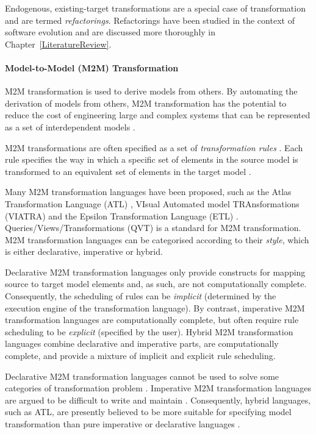 Endogenous, existing-target transformations are a special case of transformation and are termed \emph{refactorings}. Refactorings have been studied in the context of software evolution and are discussed more thoroughly in Chapter~\ref{LiteratureReview}.


\paragraph{Model-to-Model (M2M) Transformation} M2M transformation is used to derive models from others. By automating the derivation of models from others, M2M transformation has the potential to reduce the cost of engineering large and complex systems that can be represented as a set of interdependent models \cite{sendall03heart}. 

M2M transformations are often specified as a set of \emph{transformation rules} \cite{czarnecki06survey}. Each rule specifies the way in which a specific set of elements in the source model is transformed to an equivalent set of elements in the target model \cite[pg.44]{kolovos09thesis}.

Many M2M transformation languages have been proposed, such as the Atlas Transformation Language (ATL) \cite{jouault05transforming}, VIsual Automated model TRAnsformations (VIATRA) \cite{VIATRA} and the Epsilon Transformation Language (ETL) \cite{kolovos08etl}. Qu\-er\-ies/Vi\-ews/Tra\-nsfo\-rma\-ti\-ons (QVT) \cite{qvt} is a standard for M2M transformation. M2M transformation languages can be categorised according to their \emph{style}, which is either declarative, imperative or hybrid.

Declarative M2M transformation languages only provide constructs for mapping source to target model elements and, as such, are not computationally complete. Consequently, the scheduling of rules can be \emph{implicit} (determined by the execution engine of the transformation language). By contrast, imperative M2M transformation languages are computationally complete, but often require rule scheduling to be \emph{explicit} (specified by the user). Hybrid M2M transformation languages combine declarative and imperative parts, are computationally complete, and provide a mixture of implicit and explicit rule scheduling.

Declarative M2M transformation languages cannot be used to solve some categories of transformation problem \cite{patrascoiu04embedding}. Imperative M2M transformation languages are argued to be difficult to write and maintain \cite[pg.45]{kolovos09thesis}. Consequently, \cc hybrid languages, such as ATL, are presently believed to be more suitable for specifying model transformation than pure imperative or declarative languages \cite{kolovos08etl}.

